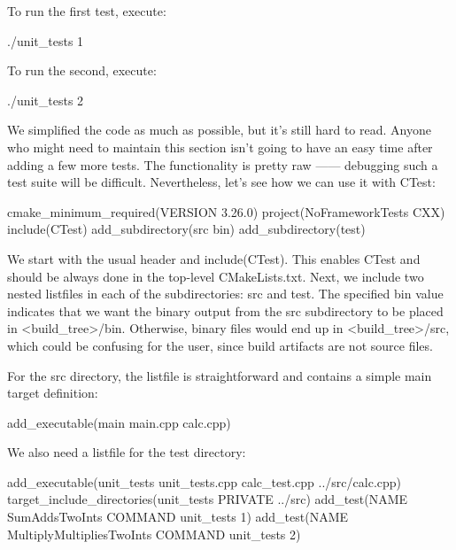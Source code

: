 To run the first test, execute:

\begin{shell}
./unit_tests 1
\end{shell}

To run the second, execute:

\begin{shell}
./unit_tests 2
\end{shell}

We simplified the code as much as possible, but it’s still hard to read. Anyone who might need to maintain this section isn’t going to have an easy time after adding a few more tests. The functionality is pretty raw —— debugging such a test suite will be difficult. Nevertheless, let’s see how we can use it with CTest:


\begin{cmake}
cmake_minimum_required(VERSION 3.26.0)
project(NoFrameworkTests CXX)
include(CTest)
add_subdirectory(src bin)
add_subdirectory(test)
\end{cmake}

We start with the usual header and include(CTest). This enables CTest and should be always done in the top-level CMakeLists.txt. Next, we include two nested listfiles in each of the subdirectories: src and test. The specified bin value indicates that we want the binary output from the src subdirectory to be placed in <build\_tree>/bin. Otherwise, binary files would end up in <build\_tree>/src, which could be confusing for the user, since build artifacts are not source files.

For the src directory, the listfile is straightforward and contains a simple main target definition:


\begin{cmake}
add_executable(main main.cpp calc.cpp)
\end{cmake}

We also need a listfile for the test directory:


\begin{cmake}
add_executable(unit_tests
               unit_tests.cpp
               calc_test.cpp
               ../src/calc.cpp)
target_include_directories(unit_tests PRIVATE ../src)
add_test(NAME SumAddsTwoInts COMMAND unit_tests 1)
add_test(NAME MultiplyMultipliesTwoInts COMMAND unit_tests 2)
\end{cmake}

